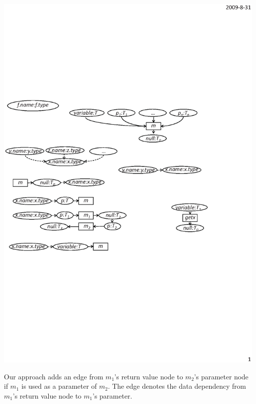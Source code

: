 \begin{center}
\includegraphics[scale=0.7,clip]{figure/rule7.eps}%
\end{center}

Our approach adds an edge from $m_1$'s return value node to $m_2$'s
parameter node if $m_1$ is used as a parameter of $m_2$. The edge
denotes the data dependency from $m_1$'s return value node to
$m_1$'s parameter.


